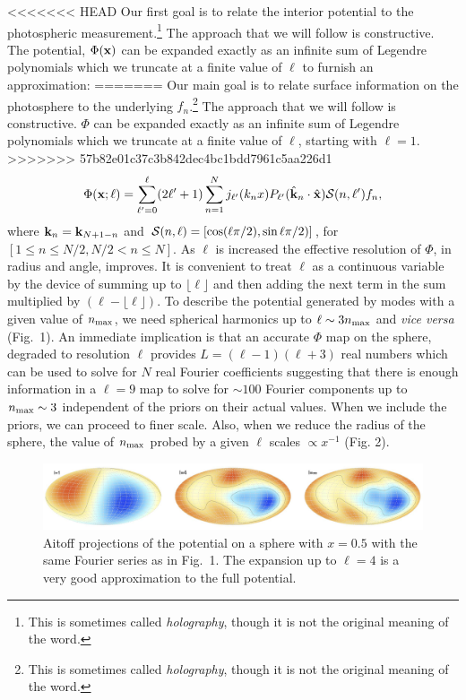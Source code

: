 \documentclass[12pt]{article}
\begin{document}
<<<<<<< HEAD
Our first goal is to relate the interior potential to the photospheric measurement.\footnote{This is sometimes called \emph{holography}, though it is not the original meaning of the word.} The approach that we will follow is constructive. The potential, $\Phi({\bf x})$ can be expanded exactly as an infinite sum of Legendre polynomials which we truncate at a finite value of $\ell$ to furnish an approximation:
=======
Our main goal is to relate surface information on the photosphere to the underlying $f_n$.\footnote{This is sometimes called \emph{holography}, though it is not the original meaning of the word.} The approach that we will follow is constructive. $\Phi$ can be expanded exactly as an infinite sum of Legendre polynomials which we truncate at a finite value of $\ell$, starting with $\ell=1$.
>>>>>>> 57b82e01c37c3b842dec4bc1bdd7961c5aa226d1
\begin{equation}
\Phi({\bf x;\ell})=\sum_{\ell'=0} ^\ell(2\ell'+1)\sum_{n=1}^Nj_{\ell'}(k_nx)P_{\ell'}({\hat{\bf k}}_n\cdot{\hat{\bf x}}){\cal S}(n,\ell')f_n,
\end{equation}
where ${\bf k}_n={\bf k}_{N+1-n}$ and ${\cal S}(n,\ell)=[\cos(\ell\pi/2),\sin\ell\pi/2)]$, for $[1\le n\le N/2,N/2<n\le N]$. As $\ell$ is increased the effective resolution of $\Phi$, in radius and angle, improves. It is convenient to treat $\ell$ as a continuous variable by the device of summing up to $\lfloor\ell\rfloor$  and then adding the next term in the sum multiplied by $(\ell-\lfloor\ell\rfloor)$. To describe the potential generated by modes with a given value of $n_{\rm max}$, we need spherical harmonics up to $\ell\sim3n_{\rm max}$ and {\it vice versa} (Fig.~1). An immediate implication is that an accurate $\Phi$ map on the sphere, degraded to resolution $\ell$ provides $L=(\ell-1)(\ell+3)$ real numbers which can be used to solve for $N$ real Fourier coefficients suggesting that there is enough information in a $\ell=9$ map to solve for $\sim100$ Fourier components up to $n_{\rm max}\sim3$ independent of the priors on their actual values. When we include the priors, we can proceed to finer scale. Also, when we reduce the radius of the sphere, the value of $n_{\rm max}$  probed by a given $\ell$ scales $\propto x^{-1}$ (Fig. 2).

\begin{figure}[h!]
\centering
\includegraphics[width=6in]{fig2.jpg}
\caption{Aitoff projections of the potential on a sphere with $x=0.5$ with the same Fourier series as in Fig.~1. The expansion up to $\ell=4$ is a very good approximation to the full potential.}
\end{figure}
\end{document}
